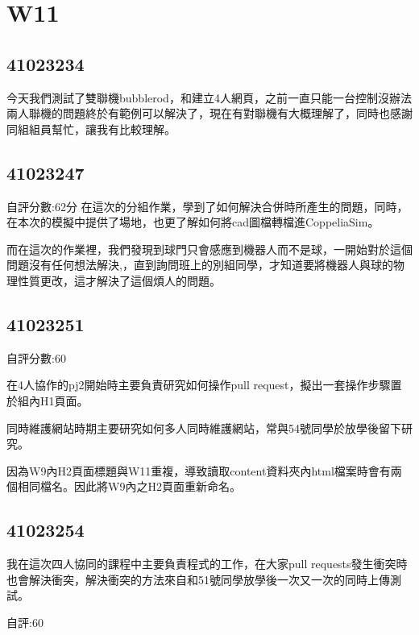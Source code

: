 \chapter{W11}


\section{41023234}

今天我們測試了雙聯機bubblerod，和建立4人網頁，之前一直只能一台控制沒辦法兩人聯機的問題終於有範例可以解決了，現在有對聯機有大概理解了，同時也感謝同組組員幫忙，讓我有比較理解。

\section{41023247}
自評分數:62分
在這次的分組作業，學到了如何解決合併時所產生的問題，同時，在本次的模擬中提供了場地，也更了解如何將cad圖檔轉檔進CoppeliaSim。

而在這次的作業裡，我們發現到球門只會感應到機器人而不是球，一開始對於這個問題沒有任何想法解決,，直到詢問班上的別組同學，才知道要將機器人與球的物理性質更改，這才解決了這個煩人的問題。
\section{41023251}

自評分數:60

在4人協作的pj2開始時主要負責研究如何操作pull request，擬出一套操作步驟置於組內H1頁面。

同時維護網站時期主要研究如何多人同時維護網站，常與54號同學於放學後留下研究。

因為W9內H2頁面標題與W11重複，導致讀取content資料夾內html檔案時會有兩個相同檔名。因此將W9內之H2頁面重新命名。


\section{41023254}

我在這次四人協同的課程中主要負責程式的工作，在大家pull requests發生衝突時也會解決衝突，解決衝突的方法來自和51號同學放學後一次又一次的同時上傳測試。

自評:60